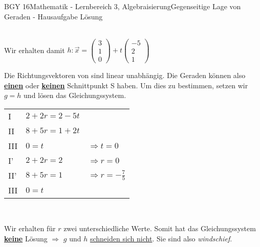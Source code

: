 \documentclass[oneside,openany,headings=optiontotoc,11pt,numbers=noenddot]{scrreprt}
\begin{document}
\begin{worksheet}{BGY 16}{Mathematik - Lernbereich 3, Algebraisierung}{Gegenseitige Lage von Geraden - Hausaufgabe Lösung}
\begin{framed}
			\normalsize\\
			Wir erhalten damit \(h: \vec{x} = \left(\begin{array}{c}3\\1\\0\end{array}\right) + t\left(\begin{array}{c}-5\\2\\1\end{array}\right)\)\\
			\par\noindent
			Die Richtungsvektoren von sind \color{blue}linear unabhängig\normalcolor. Die Geraden können also \textbf{\underline{einen}} oder \textbf{\underline{keinen}} Schnittpunkt S haben. Um dies zu bestimmen, setzen wir \(g=h\) und lösen das Gleichungssystem.\\
			\begin{center}
				\begin{tabular}{lll}
					I & \(2 + 2r = 2 -5t\)\\
					II & \(8 +5r = 1 + 2t\) \\
					III & \(0 = t\) & \(\Rightarrow t = 0\)\\
					\hline 
					I' & \(2 + 2r = 2\) & \(\Rightarrow r = 0\)\\
					II' & \(8+5r = 1\) & \(\Rightarrow r = -\frac{7}{5}\)\\
					III & \( 0 = t\)
				\end{tabular}\\
			\end{center}
			Wir erhalten für \(r\) zwei unterschiedliche Werte. Somit hat das Gleichungssystem \textbf{\underline{keine}} Lösung \( \Rightarrow \) \(g\) und \(h\) \color{codegreen}\underline{schneiden sich nicht}\normalcolor{}. Sie sind also \textit{windschief}.
		\end{framed}
	\end{worksheet}
\end{document}
